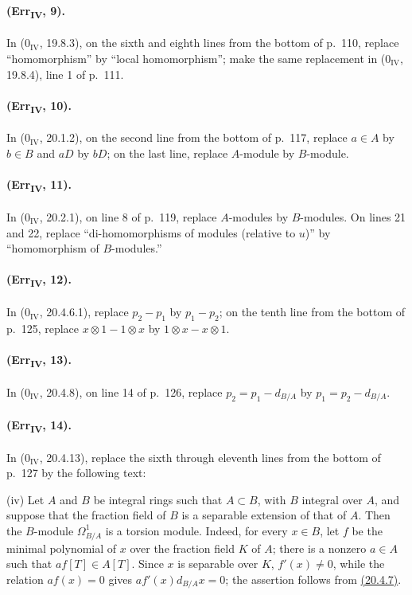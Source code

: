 \paragraph{(Err\textsubscript{IV}, 9).}
In ($0_{\mathrm{IV}}$, 19.8.3), on the sixth and eighth lines from the
bottom of p.~110, replace ``homomorphism'' by ``local homomorphism'';
make the same replacement in ($0_{\mathrm{IV}}$, 19.8.4), line 1 of
p.~111.

\paragraph{(Err\textsubscript{IV}, 10).}
In ($0_{\mathrm{IV}}$, 20.1.2), on the second line from the bottom of
p.~117, replace $a\in A$ by $b\in B$ and $aD$ by $bD$; on the last line,
replace $A$-module by $B$-module.

\paragraph{(Err\textsubscript{IV}, 11).}
In ($0_{\mathrm{IV}}$, 20.2.1), on line 8 of p.~119, replace
$A$-modules by $B$-modules.  On lines 21 and 22, replace
``di-homomorphisms of modules (relative to $u$)'' by ``homomorphism of
$B$-modules.''

\paragraph{(Err\textsubscript{IV}, 12).}
In ($0_{\mathrm{IV}}$, 20.4.6.1), replace $p_2-p_1$ by $p_1-p_2$; on
the tenth line from the bottom of p.~125, replace
$x\otimes1-1\otimes x$ by $1\otimes x-x\otimes1$.

\paragraph{(Err\textsubscript{IV}, 13).}
In ($0_{\mathrm{IV}}$, 20.4.8), on line 14 of p.~126, replace
$p_2=p_1-d_{B/A}$ by $p_1=p_2-d_{B/A}$.

\paragraph{(Err\textsubscript{IV}, 14).}
In ($0_{\mathrm{IV}}$, 20.4.13), replace the sixth through eleventh
lines from the bottom of p.~127 by the following text:

\medskip
\noindent
(iv) Let $A$ and $B$ be integral rings such that $A\subset B$, with
$B$ integral over $A$, and suppose that the fraction field of $B$ is a
separable extension of that of $A$.  Then the $B$-module
$\Omega^1_{B/A}$ is a torsion module.  Indeed, for every $x\in B$, let
$f$ be the minimal polynomial of $x$ over the fraction field $K$ of
$A$; there is a nonzero $a\in A$ such that $af[T]\in A[T]$.  Since $x$
is separable over $K$, $f'(x)\neq0$, while the relation $af(x)=0$
gives $af'(x)d_{B/A}x=0$; the assertion follows from {\hyperref[IV.20]{(20.4.7)}}.

